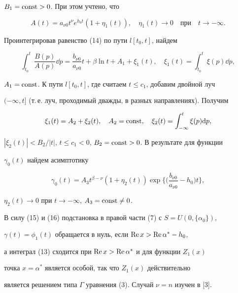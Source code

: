 $B_1=\operatorname{const}>0$. При этом учтено, что


\begin{equation}


A(t)=a_{\nu 0}t^{\nu}e^{h_0t}(1+\eta_1(t)), \quad \eta_1(t)\to 0 \quad


\text{при} \quad t\to -\infty.


\end{equation}


Проинтегрировав равенство (14) по пути $l[t_0,t]$, найдем


$$


\int_{t_0}^t\frac{B(p)}{A(p)}\dd p=\frac{b_{\nu 0}}{a_{\nu 0}}t+


\beta\ln t+A_1+\xi_1(t),\quad \xi_1(t)=\int_{t_0}^t\xi(p)\dd p,


$$


$A_1=\operatorname{const}$. К пути $l[t_0,t]$, где считаем $t\le c_1$, добавим двойной луч


$(-\infty,t]$ (т.\,е. луч, проходимый дважды, в разных направлениях). Получим


$$


\xi_1(t)=A_2+\xi_2(t),\quad A_2=\const,


\quad \xi_2(t)=\int_{-\infty}^t\xi(p)\dd p,


$$


$|\xi_2(t)|<B_2/|t|$, $t\le c_1<0$, $B_2=\operatorname{const}>0$. В результате для функции


$\gamma_0(t)$ найдем асимптотику


\begin{equation}


\gamma_0(t)=A_3t^{\beta-\nu}(1+\eta_2(t))


\exp{\bigg\{ \bigg( \frac{b_{\nu 0}}{a_{\nu 0}}-h_0 \bigg) t \bigg\}},


\end{equation}


$\eta_2(t)\to 0$ при $t\to -\infty$, $A_3=\operatorname{const}\ne 0$.





В силу (15) и (16) подстановка в правой части (7) с $S=U(0,\{\alpha_0\})$,


$\gamma(t)=\phi_1(t)$ обращается в нуль, если $\operatorname{Re} x>\operatorname{Re}\alpha^*-h_0$,


а интеграл (13) сходится при $\operatorname{Re} x>\operatorname{Re}\alpha^*$ и для функции $Z_1(x)$


точка $x=\alpha^*$ является особой, так что $Z_1(x)$ действительно


является решением типа $\Gamma$ уравнения (3). Случай $\nu=n$ изучен в [3].


